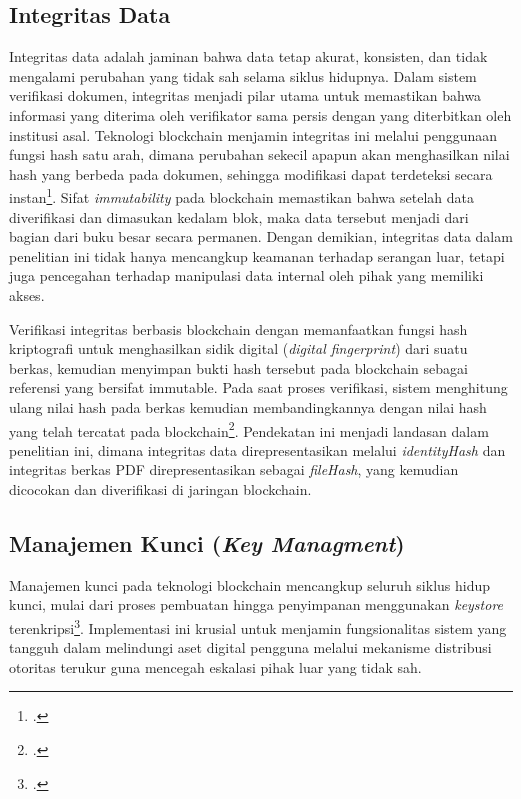 		
		\subsection{Integritas Data}
		Integritas data adalah jaminan bahwa data tetap akurat, konsisten, dan tidak mengalami perubahan yang tidak sah selama siklus hidupnya. Dalam sistem verifikasi dokumen, integritas menjadi pilar utama untuk memastikan bahwa informasi yang diterima oleh verifikator sama persis dengan yang diterbitkan oleh institusi asal. Teknologi blockchain menjamin integritas ini melalui penggunaan fungsi hash satu arah, dimana perubahan sekecil apapun akan menghasilkan nilai hash yang berbeda pada dokumen, sehingga modifikasi dapat terdeteksi secara instan\footcite{Zheng2017}. Sifat \textit{immutability} pada blockchain memastikan bahwa setelah data diverifikasi dan dimasukan kedalam blok, maka data tersebut menjadi dari bagian dari buku besar secara permanen. Dengan demikian, integritas data dalam penelitian ini tidak hanya mencangkup keamanan terhadap serangan luar, tetapi juga pencegahan terhadap manipulasi data internal oleh pihak yang memiliki akses.

		Verifikasi integritas berbasis blockchain dengan memanfaatkan fungsi hash kriptografi untuk menghasilkan sidik digital (\textit{digital fingerprint}) dari suatu berkas, kemudian menyimpan bukti hash tersebut pada blockchain sebagai referensi yang bersifat immutable. Pada saat proses verifikasi, sistem menghitung ulang nilai hash pada berkas kemudian membandingkannya dengan nilai hash yang telah tercatat pada blockchain\footcite{Ramya2026}. Pendekatan ini menjadi landasan dalam penelitian ini, dimana integritas data direpresentasikan melalui \textit{identityHash} dan integritas berkas PDF direpresentasikan sebagai \textit{fileHash}, yang kemudian dicocokan dan diverifikasi di jaringan blockchain.


		
		\subsection{Manajemen Kunci (\textit{Key Managment})}
		Manajemen kunci pada teknologi blockchain mencangkup seluruh siklus hidup kunci, mulai dari proses pembuatan hingga penyimpanan menggunakan \textit{keystore} terenkripsi\footcite{Pal2021}. Implementasi ini krusial untuk menjamin fungsionalitas sistem yang tangguh dalam melindungi aset digital pengguna melalui mekanisme distribusi otoritas terukur guna mencegah eskalasi pihak luar yang tidak sah.


